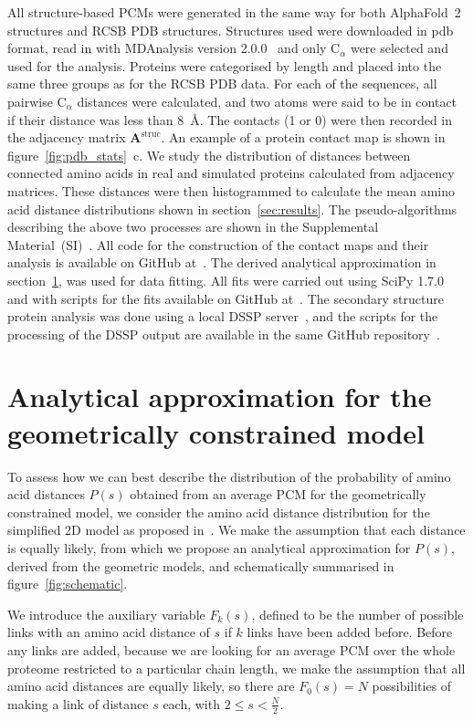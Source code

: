 \documentclass[10pt]{iopart}
\begin{document}
All structure-based PCMs were generated in the same way for both AlphaFold~2 structures and RCSB PDB structures. Structures used were downloaded in pdb format, read in with MDAnalysis version 2.0.0~\cite{gowers2016mdanalysis} and only C$_{\alpha}$ were selected and used for the analysis. Proteins were categorised by length and placed into the same three groups as for the RCSB PDB data. For each of the sequences, all pairwise C$_\alpha$ distances were calculated, and two atoms were said to be in contact if their distance was less than 8~Å. The contacts (1 or 0) were then recorded in the adjacency matrix $\mathbf{A}^{\mathrm{struc}}$. An example of a protein contact map is shown in figure~\ref{fig:pdb_stats}~c. We study the distribution of distances between connected amino acids in real and simulated proteins calculated from adjacency matrices. These distances were then histogrammed to calculate the mean amino acid distance distributions shown in section~\ref{sec:results}. The pseudo-algorithms describing the above two processes are shown in the Supplemental Material~(SI)~\cite{SI}. All code for the construction of the contact maps and their analysis is available on GitHub at~\cite{2022sequence}. The derived analytical approximation in section~\ref{sec:theory}, was used for data fitting. All fits were carried out using SciPy 1.7.0 and with scripts for the fits available on GitHub at~\cite{2022sequence}. The secondary structure protein analysis was done using a local DSSP server~\cite{1983kabsch}, and the scripts for the processing of the DSSP output are available in the same GitHub repository~\cite{2022sequence}.

\section{Analytical approximation for the geometrically constrained model}\label{sec:theory}

To assess how we can best describe the distribution of the probability of amino acid distances $P(s)$ obtained from an average PCM for the geometrically constrained model, we consider the amino acid distance distribution for the simplified 2D model as proposed in~\cite{molkenthin2016scaling}. We make the assumption that each distance is equally likely, from which we propose an analytical approximation for $P(s)$, derived from the geometric models, and schematically summarised in figure~\ref{fig:schematic}.

We introduce the auxiliary variable $F_k(s)$, defined to be the number of possible links with an amino acid distance of $s$ if $k$ links have been added before. Before any links are added, because we are looking for an average PCM over the whole proteome restricted to a particular chain length, we make the assumption that all amino acid distances are equally likely, so there are $F_0(s)=N$ possibilities of making a link of distance $s$ each, with $2\leq s < \frac{N}{2}$.
\end{document}
